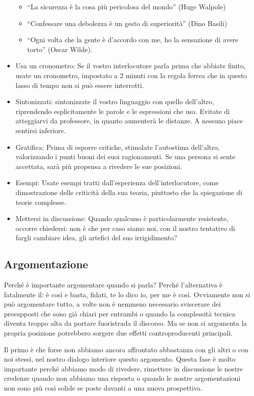 \documentclass[12pt]{book} %
\begin{document}
\begin{itemize}
\begin{itemize}
\item “La sicurezza è la cosa più pericolosa del mondo” (Huge Walpole)
\item “Confessare una debolezza è un gesto di superiorità” (Dino Basili)
\item “Ogni volta che la gente è d'accordo con me, ho la sensazione di avere torto” (Oscar Wilde).
\end{itemize}
\item Usa un cronometro: Se il vostro interlocutore parla prima che abbiate finito, usate un cronometro, impostato a 2
minuti con la regola ferrea che in questo lasso di tempo non si può essere interrotti.
\item Sintonizzati: sintonizzate il vostro linguaggio con quello dell'altro, riprendendo esplicitamente le parole e le
espressioni che usa. Evitate di atteggiarvi da professore, in quanto aumenterà le distanze. A nessuno piace sentirsi
{\textquotedbl}inferiore{\textquotedbl}.
\item Gratifica: Prima di esporre critiche, stimolate l'autostima dell'altro, valorizzando i punti buoni dei suoi
ragionamenti. Se una persona si sente accettata, sarà più propensa a rivedere le sue posizioni.
\item Esempi: Usate esempi tratti dall'esperienza dell'interlocutore, come dimostrazione delle criticità della sua
teoria, piuttosto che la spiegazione di teorie complesse.
\item Mettersi in discussione: Quando qualcuno è particolarmente resistente, occorre chiedersi: non è che per caso siamo
noi, con il nostro tentativo di fargli cambiare idea, gli artefici del suo irrigidimento?
\end{itemize}

\bigskip

\subsection{Argomentazione}
Perché è importante argomentare quando si parla? Perché l'alternativa è fatalmente il: è così e
basta, fidati, te lo dico io, per me è così. Ovviamente non si può argomentare tutto, a volte non è nemmeno necessario
sviscerare dei presupposti che sono già chiari per entrambi o quando la complessità tecnica diventa troppo alta da
portare fuoristrada il discorso. Ma se non si argomenta la propria posizione potrebbero sorgere due effetti
controproducenti principali.

Il primo è che forse non abbiamo ancora affrontato abbastanza con gli altri o con noi stessi, nel nostro dialogo
interiore questo argomento. Questa fase è molto importante perché abbiamo modo di rivedere, rimettere in discussione le
nostre credenze quando non abbiamo una risposta o quando le nostre argomentazioni non sono più così solide se poste
davanti a una nuova prospettiva. 
\end{document}
